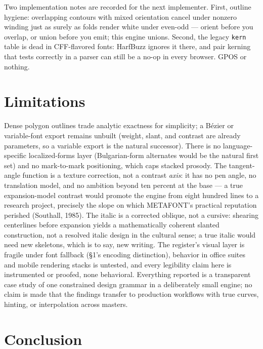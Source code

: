 \documentclass[12pt]{article}
\begin{document}
Two implementation notes are recorded for the next implementer. First, outline hygiene: overlapping contours with mixed orientation cancel under nonzero winding just as surely as folds render white under even-odd — orient before you overlap, or union before you emit; this engine unions. Second, the legacy \texttt{kern} table is dead in CFF-flavored fonts: HarfBuzz ignores it there, and pair kerning that tests correctly in a parser can still be a no-op in every browser. GPOS or nothing.

\section{Limitations}\label{sec:limits}

Dense polygon outlines trade analytic exactness for simplicity; a Bézier or variable-font export remains unbuilt (weight, slant, and contrast are already parameters, so a variable export is the natural successor). There is no language-specific localized-forms layer (Bulgarian-form alternates would be the natural first set) and no mark-to-mark positioning, which caps stacked prosody. The tangent-angle function is a texture correction, not a contrast \emph{axis}: it has no pen angle, no translation model, and no ambition beyond ten percent at the base — a true expansion-model contrast would promote the engine from eight hundred lines to a research project, precisely the slope on which METAFONT's practical reputation perished (Southall, 1985). The italic is a corrected oblique, not a cursive: shearing centerlines before expansion yields a mathematically coherent slanted construction, not a resolved italic design in the cultural sense; a true italic would need new skeletons, which is to say, new writing. The register's visual layer is fragile under font fallback (\S1's encoding distinction), behavior in office suites and mobile rendering stacks is untested, and every legibility claim here is instrumented or proofed, none behavioral. Everything reported is a transparent case study of one constrained design grammar in a deliberately small engine; no claim is made that the findings transfer to production workflows with true curves, hinting, or interpolation across masters.

\section{Conclusion}
\end{document}
